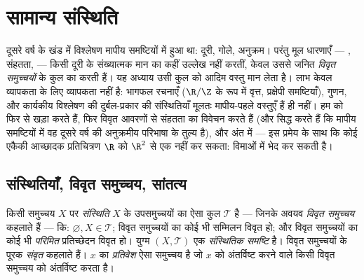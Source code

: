 \chapter{सामान्य संस्थिति}\label{ch:b3:topology}

दूसरे वर्ष के खंड में विश्लेषण मापीय समष्टियों में हुआ था: दूरी,
गोले, अनुक्रम। परंतु मूल धारणाएँ --- , संहतता,  ---
किसी दूरी के संख्यात्मक मान का कहीं उल्लेख नहीं करतीं, केवल उससे
जनित \emph{विवृत समुच्चयों} के कुल का करती हैं। यह अध्याय उसी कुल
को आदिम वस्तु मान लेता है। लाभ केवल व्यापकता के लिए व्यापकता नहीं
है: भागफल रचनाएँ ($\R/\Z$ के रूप में वृत्त, प्रक्षेपी समष्टियाँ),
गुणन, और कार्यकीय विश्लेषण की दुर्बल-प्रकार की संस्थितियाँ मूलतः
मापीय-पहले वस्तुएँ हैं ही नहीं। हम  को फिर से खड़ा करते
हैं, फिर विवृत आवरणों से संहतता का विवेचन करते हैं (और सिद्ध करते
हैं कि मापीय समष्टियों में वह दूसरे वर्ष की अनुक्रमीय परिभाषा के
तुल्य है), और अंत में  --- इस प्रमेय के साथ कि कोई 
एकैकी आच्छादक प्रतिचित्रण $\R$ को $\R^2$ से एक नहीं कर सकता: 
विमाओं में भेद कर सकती है।

\section{संस्थितियाँ, विवृत समुच्चय, सांतत्य}

\begin{definition}\label{def:b3:topology:topology}
किसी समुच्चय $X$ पर \emph{संस्थिति} $X$ के
उपसमुच्चयों का ऐसा कुल $\mathcal T$ है --- जिनके अवयव \emph{विवृत
समुच्चय} कहलाते हैं --- कि: $\varnothing, X \in
\mathcal T$; विवृत
समुच्चयों का कोई भी सम्मिलन विवृत हो; और विवृत समुच्चयों का कोई भी
\emph{परिमित} प्रतिच्छेदन विवृत हो। युग्म $(X, \mathcal T)$ एक \emph{संस्थितिक
समष्टि} है। विवृत समुच्चयों के पूरक \emph{संवृत} कहलाते हैं।
$x$ का \emph{प्रतिवेश} ऐसा समुच्चय है जो $x$
को अंतर्विष्ट करने वाले किसी विवृत समुच्चय को अंतर्विष्ट करता है।
\end{definition}

